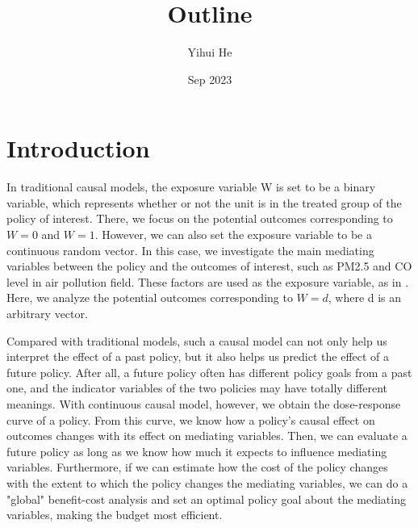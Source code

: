 \documentclass{article}
\title{Outline}
\author{Yihui He}
\date{Sep 2023}
\theoremstyle{definition}
\newtheorem{proof of proposition}{Proof of Proposition}
\begin{document}
\maketitle
\setup
\section{Introduction}

In traditional causal models, the exposure variable W is set to be a binary variable, which represents whether or not the unit is in the treated group of the policy of interest. There, we focus on the potential outcomes corresponding to $W=0$ and $W=1$. However, we can also set the exposure variable to be a continuous random vector. In this case, we investigate the main mediating variables between the policy and the outcomes of interest, such as PM2.5 and CO level in air pollution field. These factors are used as the exposure variable, as in \cite{munoz2012population}. Here, we analyze the potential outcomes corresponding to $W=d$, where d is an arbitrary vector. 

Compared with traditional models, such a causal model can not only help us interpret the effect of a past policy, but it also helps us predict the effect of a future policy. After all, a future policy often has different policy goals from a past one, and the indicator variables of the two policies may have totally different meanings.  With continuous causal model, however, we obtain the dose-response curve of a policy. From this curve, we know how a policy's causal effect on outcomes changes with its effect on mediating variables. Then, we can evaluate a future policy as long as we know how much it expects to influence mediating variables. Furthermore, if we can estimate how the cost of the policy changes with the extent to which the policy changes the mediating variables, we can do a "global" benefit-cost analysis and set an optimal policy goal about the mediating variables, making the budget most efficient.
\end{document}
